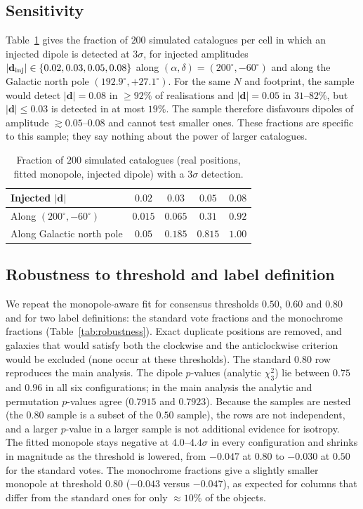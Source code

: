 \documentclass[preprint,12pt]{elsarticle}
\begin{document}
\subsection{Sensitivity}
\label{sec:sens}

Table~\ref{tab:sens} gives the fraction of $200$ simulated catalogues per cell in which an injected dipole is detected at $3\sigma$, for injected amplitudes $|\mathbf{d}_{\rm inj}| \in \{0.02, 0.03, 0.05, 0.08\}$ along $(\alpha,\delta)=(200^\circ,-60^\circ)$ and along the Galactic north pole $(192.9^\circ,+27.1^\circ)$.
For the same $N$ and footprint, the sample would detect $|\mathbf{d}|=0.08$ in $\ge92\%$ of realisations and $|\mathbf{d}|=0.05$ in $31$--$82\%$, but $|\mathbf{d}|\le0.03$ is detected in at most $19\%$.
The sample therefore disfavours dipoles of amplitude $\gtrsim0.05$--$0.08$ and cannot test smaller ones.
These fractions are specific to this sample; they say nothing about the power of larger catalogues.

\begin{table}[t]
\caption{\label{tab:sens}Fraction of $200$ simulated catalogues (real positions, fitted monopole, injected dipole) with a $3\sigma$ detection.}
\centering
\begin{tabular}{lcccc}
\toprule
Injected $|\mathbf{d}|$ & $0.02$ & $0.03$ & $0.05$ & $0.08$\\
\midrule
Along $(200^\circ,-60^\circ)$ & $0.015$ & $0.065$ & $0.31$ & $0.92$\\
Along Galactic north pole & $0.05$ & $0.185$ & $0.815$ & $1.00$\\
\bottomrule
\end{tabular}
\end{table}

\subsection{Robustness to threshold and label definition}
\label{sec:robust}

We repeat the monopole-aware fit for consensus thresholds $0.50$, $0.60$ and $0.80$ and for two label definitions: the standard vote fractions and the monochrome fractions (Table~\ref{tab:robustness}).
Exact duplicate positions are removed, and galaxies that would satisfy both the clockwise and the anticlockwise criterion would be excluded (none occur at these thresholds).
The standard $0.80$ row reproduces the main analysis.
The dipole $p$-values (analytic $\chi^2_3$) lie between $0.75$ and $0.96$ in all six configurations; in the main analysis the analytic and permutation $p$-values agree ($0.7915$ and $0.7923$).
Because the samples are nested (the $0.80$ sample is a subset of the $0.50$ sample), the rows are not independent, and a larger $p$-value in a larger sample is not additional evidence for isotropy.
The fitted monopole stays negative at $4.0$--$4.4\sigma$ in every configuration and shrinks in magnitude as the threshold is lowered, from $-0.047$ at $0.80$ to $-0.030$ at $0.50$ for the standard votes.
The monochrome fractions give a slightly smaller monopole at threshold $0.80$ ($-0.043$ versus $-0.047$), as expected for columns that differ from the standard ones for only $\approx10\%$ of the objects.
\end{document}
